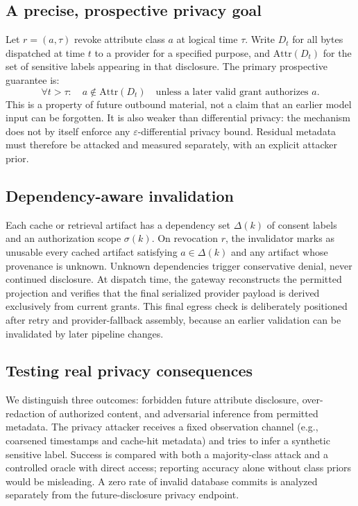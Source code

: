 \documentclass[11pt,a4paper]{article}
\begin{document}
\subsection{A precise, prospective privacy goal}
Let $r=(a,\tau)$ revoke attribute class $a$ at logical time $\tau$. Write $D_t$ for all bytes dispatched at time $t$ to a provider for a specified purpose, and $\mathrm{Attr}(D_t)$ for the set of sensitive labels appearing in that disclosure. The primary prospective guarantee is:
\begin{equation}
  \forall t>\tau:\quad a\notin\mathrm{Attr}(D_t)\quad
  \text{unless a later valid grant authorizes }a.
\end{equation}
This is a property of future outbound material, not a claim that an earlier model input can be forgotten. It is also weaker than differential privacy: the mechanism does not by itself enforce any $\varepsilon$-differential privacy bound. Residual metadata must therefore be attacked and measured separately, with an explicit attacker prior.

\subsection{Dependency-aware invalidation}
Each cache or retrieval artifact has a dependency set $\Delta(k)$ of consent labels and an authorization scope $\sigma(k)$. On revocation $r$, the invalidator marks as unusable every cached artifact satisfying $a\in\Delta(k)$ and any artifact whose provenance is unknown. Unknown dependencies trigger conservative denial, never continued disclosure. At dispatch time, the gateway reconstructs the permitted projection and verifies that the final serialized provider payload is derived exclusively from current grants. This final egress check is deliberately positioned after retry and provider-fallback assembly, because an earlier validation can be invalidated by later pipeline changes.

\subsection{Testing real privacy consequences}
We distinguish three outcomes: forbidden future attribute disclosure, over-redaction of authorized content, and adversarial inference from permitted metadata. The privacy attacker receives a fixed observation channel (e.g., coarsened timestamps and cache-hit metadata) and tries to infer a synthetic sensitive label. Success is compared with both a majority-class attack and a controlled oracle with direct access; reporting accuracy alone without class priors would be misleading. A zero rate of invalid database commits is analyzed separately from the future-disclosure privacy endpoint.
\end{document}
